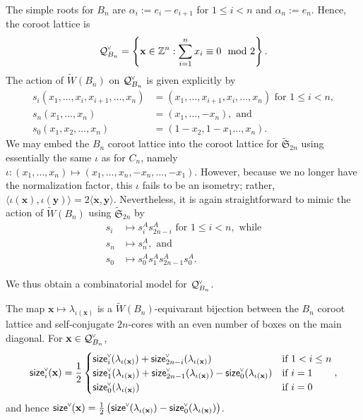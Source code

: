 \documentclass[ALCO,published]{cedram}
\newcommand{\chk}[1]{#1^{\normalfont\smash{\scalebox{.5}[.5]{\rotatebox{90}{\textbf{\textless}}}}}}
\newcommand{\wa}{\widetilde{W}}
\newcommand{\Q}{\mathcal{Q}}
\newcommand{\size}{{\sf size}}
\begin{document}
The simple roots for $B_n$ are $\alpha_i:=e_i-e_{i+1}$ for $1\leq i < n$ and $\alpha_n:=e_n$.
Hence, the coroot lattice is \[\chk{\Q}_{B_n} = \left\{\mathbf{x} \in \mathbb{Z}^n : \sum_{i=1}^n x_i \equiv 0 \mod 2\right\}.\]  The action of $\wa(B_n)$ on $\chk{\Q}_{B_n}$ is given explicitly by
\begin{align*}s_i(x_1,\ldots,x_i,x_{i+1},\ldots,x_n) &= (x_1,\ldots,x_{i+1},x_{i},\ldots,x_n) \text{ for } 1 \leq i < n,\\
s_n(x_1,\ldots,x_n) &= (x_1,\ldots,-x_n), \text{ and }\\
s_0(x_1,x_2,\ldots,x_n) &= (1-x_2,1-x_1\ldots,x_n).
\end{align*}
We may embed the $B_n$ coroot lattice into the coroot lattice for $\widetilde{\mathfrak{S}}_{2n}$ using essentially the same $\iota$ as for $C_n$, namely $\iota: (x_1,\ldots,x_n) \mapsto (x_1,\ldots,x_n,-x_n,\ldots,-x_1)$. However, because we no longer have the normalization factor, this $\iota$ fails to be an isometry; rather, $\langle\iota(\mathbf{x}),\iota(\mathbf{y})\rangle = 2 \langle\mathbf{x},\mathbf{y}\rangle$.
Nevertheless, it is again straightforward to mimic the action of $\wa(B_n)$ using $\widetilde{\mathfrak{S}}_{2n}$ by
\begin{align*}
s_i &\mapsto s_i^A s_{2n-i}^A \text{ for } 1 \leq i < n, \text{ while}\\
s_n &\mapsto s_n^A, \text{ and}\\
s_0 &\mapsto s_0^As_1^As_{2n-1}^As_0^A.
\end{align*}

We thus obtain a combinatorial model for $\chk{\Q}_{B_n}$.

\begin{theorem}
\label{thm:bn_cores}
The map $\mathbf{x}\mapsto \lambda_{\iota(\mathbf{x})}$ is a $\wa(B_n)$-equivarant bijection between the $B_n$ coroot lattice and self-conjugate $2n$-cores with an even number of boxes on the main diagonal. For $\mathbf{x} \in \chk{\Q}_{B_n}$, 
\[
\chk{\size}_i(\mathbf{x})= \frac{1}{2}
\begin{cases}
\chk{\size}_i(\lambda_{\iota(\mathbf{x})}) + \chk{\size}_{2n-i}(\lambda_{\iota(\mathbf{x})}) & \text{if } 1<i\leq n \\ 
\chk{\size}_1(\lambda_{\iota(\mathbf{x})}) + \chk{\size}_{2n-1}(\lambda_{\iota(\mathbf{x})}) -\chk{\size}_0(\lambda_{\iota(\mathbf{x})}) & \text{if } i=1 \\ \chk{\size}_0(\lambda_{\iota(\mathbf{x})}) & \text{if } i=0
\end{cases}
,
\] and hence
$\chk{\size}(\mathbf{x}) = \frac{1}{2}\left( \chk{\size}(\lambda_{\iota(\mathbf{x})}) - \chk{\size}_0(\lambda_{\iota(\mathbf{x})}) \right)$.
\end{theorem}
\end{document}
